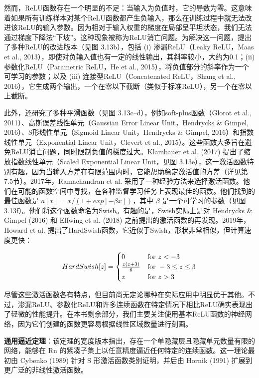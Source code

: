 \documentclass[lang=cn,newtx,10pt,scheme=chinese]{elegantbook}
\begin{document}
然而，ReLU函数存在一个明显的不足：当输入为负值时，它的导数为零。这意味着如果所有训练样本对某个ReLU函数都产生负输入，那么在训练过程中就无法改进该ReLU的输入参数。因为相对于输入权重的梯度在局部呈平坦状态，我们无法通过梯度下降法“下坡”。这种现象被称为ReLU消亡问题。为解决这一问题，提出了多种ReLU的改进版本（见图 3.13b），包括 (i) 渗漏ReLU（Leaky ReLU，Maas et al., 2013），即使对负输入值也有一定的线性输出，其斜率较小，大约为0.1；(ii) 参数化ReLU（Parametric ReLU，He et al., 2015），将负值部分的斜率作为一个可学习的参数；以及 (iii) 连接型ReLU（Concatenated ReLU，Shang et al., 2016），它生成两个输出，一个在零以下截断（类似于标准ReLU），另一个在零以上截断。

此外，还研究了多种平滑函数（见图 3.13c–d），例如soft-plus函数（Glorot et al., 2011）、高斯误差线性单元（Gaussian Error Linear Unit，Hendrycks \& Gimpel, 2016）、S形线性单元（Sigmoid Linear Unit，Hendrycks \& Gimpel, 2016）和指数线性单元（Exponential Linear Unit，Clevert et al., 2015）。这些函数大多旨在避免ReLU消亡问题，同时限制负值的梯度过大。Klambauer et al. (2017) 提出了缩放指数线性单元（Scaled Exponential Linear Unit，见图 3.13e），这一激活函数特别有趣，因为当输入方差在有限范围内时，它能帮助稳定激活值的方差（详见第7.5节）。2017年，Ramachandran et al. 采用了一种经验方法来选择激活函数。他们在可能的函数空间中寻找，在各种监督学习任务上表现最佳的函数。他们找到的最佳函数是 \(a[x] = x/(1 + exp[−\beta x])\)，其中 \(\beta\) 是一个可学习的参数（见图 3.13f）。他们将这个函数命名为Swish。有趣的是，Swish实际上是对 Hendrycks \& Gimpel (2016) 和 Elfwing et al. (2018) 之前提出的激活函数的再发现。2019年，Howard et al. 提出了HardSwish函数，它近似于Swish，形状非常相似，但计算速度更快：

\begin{equation}
HardSwish[z] =
\begin{cases} 
	0 & \text{for } z < -3 \notag \\
	\frac{z(z + 3)}{6} & \text{for } -3 \leq z \leq 3 \notag \\
	z & \text{for } z > 3 
\end{cases} 
\end{equation}

尽管这些激活函数各有特点，但目前尚无定论哪种在实际应用中明显优于其他。不过，渗漏ReLU、参数化ReLU和许多连续函数在特定情况下相比ReLU确实表现出了轻微的性能提升。在本书剩余部分，我们主要关注使用基本ReLU函数的神经网络，因为它们创建的函数更容易根据线性区域数量进行刻画。

\textbf{通用逼近定理}：该定理的宽度版本指出，存在一个单隐藏层且隐藏单元数量有限的网络，能够在 Rn 的紧凑子集上以任意精度逼近任何特定的连续函数。这一理论最初由 Cybenko (1989) 针对 S 形激活函数类别证明，并后由 Hornik (1991) 扩展到更广泛的非线性激活函数。
\end{document}
